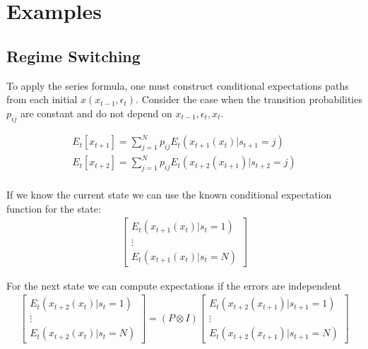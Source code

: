 \documentclass[12pt]{article}
\begin{document}






\section{Examples}
\label{sec:extension}




\subsection{Regime Switching}
\label{sec:ressw}




\label{sec:regime-switch-model}

To apply the series formula, one must construct conditional expectations paths from each initial $x(x_{t-1},\epsilon_t)$.  Consider the case when the transition 
probabilities $p_{ij}$ are constant and do not depend on 
$x_{t-1},\epsilon_t,x_t$.

\begin{gather*}
E_t[x_{t+1}]=  \sum_{j=1}^{N} p_{ij} E_t(x_{t+1}(x_t)|s_{t+1}=j)  \\
E_t[x_{t+2}]=  \sum_{j=1}^{N} p_{ij} E_t(x_{t+2}(x_{t+1})|s_{t+2}=j)  \\
\end{gather*}

If we know the current state we can use the known conditional expectation function for the state:
\begin{gather*}
    \begin{bmatrix}
E_t(x_{t+1}(x_{t})|s_{t}=1)  \\    \vdots \\
E_t(x_{t+1}(x_{t})|s_{t}=N)  
  \end{bmatrix}
\end{gather*}

For the next state we can compute expectations if the errors are independent
\begin{gather*}
  \begin{bmatrix}
E_t(x_{t+2}(x_t)|s_{t}=1)  \\    \vdots \\
E_t(x_{t+2}(x_t)|s_{t}=N)  
  \end{bmatrix}=
(P \otimes  I)
  \begin{bmatrix}
E_t(x_{t+2}(x_{t+1})|s_{t+1}=1)  \\    \vdots \\
E_t(x_{t+2}(x_{t+1})|s_{t+1}=N)  
  \end{bmatrix}
\end{gather*}
\end{document}
